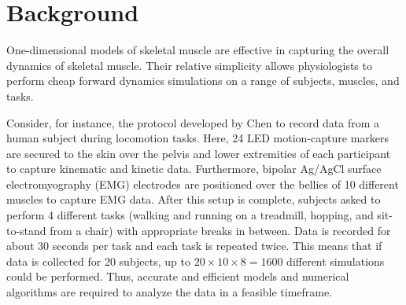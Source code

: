 \documentclass{sfuthesis}
\numberwithin{equation}{chapter}
\numberwithin{figure}{chapter}
\numberwithin{table}{chapter}
\theoremstyle{definition}
\begin{document}
\section{Background}

One-dimensional models of skeletal muscle are effective in capturing the overall dynamics of skeletal muscle. Their relative simplicity allows physiologists to perform cheap forward dynamics simulations on a range of subjects, muscles, and tasks.

Consider, for instance, the protocol developed by Chen \cite{EvanThesis} to record data from a human subject during locomotion tasks. Here, 24 LED motion-capture markers are secured to the skin over the pelvis and lower extremities of each participant to capture kinematic and kinetic data. Furthermore, bipolar Ag/AgCl surface electromyography (EMG) electrodes are positioned over the bellies of 10 different muscles to capture EMG data. After this setup is complete, subjects asked to perform 4 different tasks (walking and running on a treadmill, hopping, and sit-to-stand from a chair) with appropriate breaks in between. Data is recorded for about 30 seconds per task and each task is repeated twice. This means that if data is collected for 20 subjects, up to $20 \times 10 \times 8 = 1600$ different simulations could be performed. Thus, accurate and efficient models and numerical algorithms are required to analyze the data in a feasible timeframe.

\end{document}
